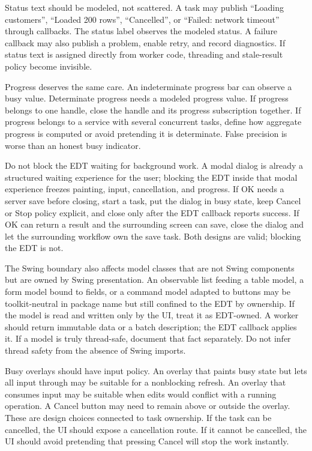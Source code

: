 Status text should be modeled, not scattered. A task may publish ``Loading
customers'', ``Loaded 200 rows'', ``Cancelled'', or ``Failed: network timeout''
through callbacks. The status label observes the modeled status. A failure
callback may also publish a problem, enable retry, and record diagnostics. If
status text is assigned directly from worker code, threading and stale-result
policy become invisible.

Progress deserves the same care. An indeterminate progress bar can observe a
busy value. Determinate progress needs a modeled progress value. If progress
belongs to one handle, close the handle and its progress subscription together.
If progress belongs to a service with several concurrent tasks, define how
aggregate progress is computed or avoid pretending it is determinate. False
precision is worse than an honest busy indicator.

Do not block the EDT waiting for background work. A modal dialog is already a
structured waiting experience for the user; blocking the EDT inside that modal
experience freezes painting, input, cancellation, and progress. If OK needs a
server save before closing, start a task, put the dialog in busy state, keep
Cancel or Stop policy explicit, and close only after the EDT callback reports
success. If OK can return a result and the surrounding screen can save, close
the dialog and let the surrounding workflow own the save task. Both designs are
valid; blocking the EDT is not.

The Swing boundary also affects model classes that are not Swing components
but are owned by Swing presentation. An observable list feeding a table model,
a form model bound to fields, or a command model adapted to buttons may be
toolkit-neutral in package name but still confined to the EDT by ownership. If
the model is read and written only by the UI, treat it as EDT-owned. A worker
should return immutable data or a batch description; the EDT callback applies
it. If a model is truly thread-safe, document that fact separately. Do not infer
thread safety from the absence of Swing imports.

Busy overlays should have input policy. An overlay that paints busy state but
lets all input through may be suitable for a nonblocking refresh. An overlay
that consumes input may be suitable when edits would conflict with a running
operation. A Cancel button may need to remain above or outside the overlay.
These are design choices connected to task ownership. If the task can be
cancelled, the UI should expose a cancellation route. If it cannot be
cancelled, the UI should avoid pretending that pressing Cancel will stop the
work instantly.

